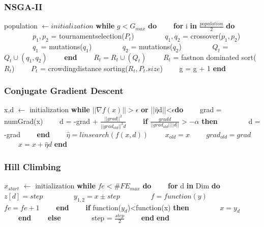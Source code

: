 \documentclass{beamer}
\begin{document}
	\begin{frame}
	\frametitle{NSGA-II}
		\begin{algorithmic}[1]
			\State population $\leftarrow initialization$
			\State \textbf{while} $g<G_{max}$ \textbf{do}
			\State \ \ \ \ \textbf{for} i \textbf{in} $\frac{population}{2}$ \textbf{do}
			\State \ \ \ \ \ \ \ \ $p_{1},p_{2}$ = tournament\textunderscore selection($P_{t}$)
			\State \ \ \ \ \ \ \ \ $q_{1},q_{2}$ = crossover($p_{1},p_{2}$)
			\State \ \ \ \ \ \ \ \ $q_{1}$ = mutations($q_{1}$)
			\State \ \ \ \ \ \ \ \ $q_{2}$ = mutations($q_{2}$)
			\State \ \ \ \ \ \ \ \ $Q_{t}$ = $Q_{t} \cup (q_{1},q_{2})$
			\State \ \ \ \ \textbf{end}
			\State \ \ \ \ $R_{t} = R_{t} \cup (Q_{t})$
			\State \ \ \ \ $R_{t}$ = fast\textunderscore non \textunderscore dominated \textunderscore sort($R_{t}$)
			\State \ \ \ \ $P_{t}$ = crowding\textunderscore distance \textunderscore sorting($R_{t},P_{t}.size$)
			\State \ \ \ \ g = g + 1
			\State \textbf{end}
		\end{algorithmic}
	\end{frame}

	\begin{frame}
	\frametitle{Conjugate Gradient Descent}
		\begin{algorithmic}[1]
			\State x,d $\leftarrow$ initialization
			\State \textbf{while} $||\nabla f(x)|| > \epsilon$ \textbf{or} ||$\hat{\eta}$d||<$\epsilon$\textbf{do}
			\State \ \ \ \ grad = numGrad(x)
			\State \ \ \ \ d = -grad + $\frac{||grad||^2}{||grad_{old}||^2d}$
			\State \ \ \ \ \textbf{if} $\frac{grad d}{||grad_{old}||||d||}>-\alpha$ \textbf{then}
			\State \ \ \ \ \ \ \ \ d = -grad
			\State \ \ \ \ \textbf{end}
			\State \ \ \ \ $\hat{\eta} = linsearch(f(x,d))$
			\State \ \ \ \ $x_{old} = x$ 
			\State \ \ \ \ $grad_{old}=grad$
			\State \ \ \ \ $x = x +\hat{\eta}d $
			\State \textbf{end}
		\end{algorithmic}
	\end{frame}

	\begin{frame}
	\frametitle{Hill Climbing}
	\begin{small}
		\begin{algorithmic}[1]
			\State $x_{start}$ $\leftarrow$ initialization
			\State \textbf{while} $fe<\#FE_{max}$ \textbf{do}
			\State \ \ \ \ \textbf{for} d \textbf{in} Dim \textbf{do}
			\State \ \ \ \ \ \ \ \ $z[d] = step$
			\State \ \ \ \ \ \ \ \ $y_{1,2} = x\pm step$
			\State \ \ \ \ \ \ \ \ $f = function(y)$
			\State \ \ \ \ \ \ \ \ $fe = fe + 1$
			\State \ \ \ \ \textbf{end}
			\State \ \ \ \ \textbf{if} function($y_{d}$)<function(x) \textbf{then} 
			\State \ \ \ \ \ \ \ \ $x = y_{d}$
			\State \ \ \ \ \textbf{end}
			\State \ \ \ \ \textbf{else}
			\State \ \ \ \ \ \ \ \ step = $\frac{step}{2}$
			\State \ \ \ \ \textbf{end}
			\State \textbf{end}
		\end{algorithmic}
	\end{small}
	\end{frame}
	
\end{document}

